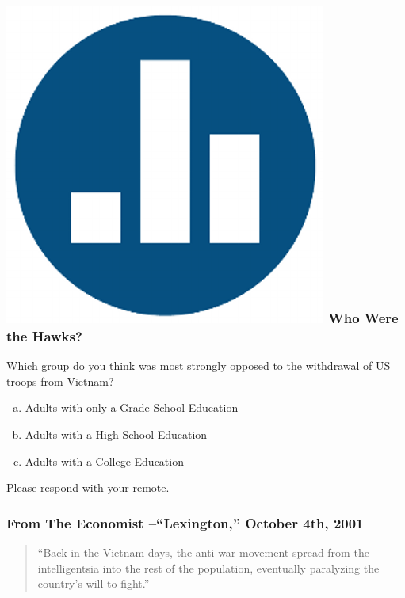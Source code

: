 \begin{frame}
\frametitle{\includegraphics[scale = 0.05]{./images/clicker} \hfill Who Were the Hawks?}
Which group do you think was most strongly \alert{opposed to} the withdrawal of US troops from Vietnam?
\begin{enumerate}[(a)]
	\item Adults with only a Grade School Education
	\item Adults with a High School Education
	\item Adults with a College Education
\end{enumerate}
\vspace{2em}
Please respond with your remote.

\end{frame}
\begin{frame}
\frametitle{From The Economist --``Lexington,'' October 4th, 2001}
\begin{quote}
 ``Back in the Vietnam days, the anti-war movement spread from the intelligentsia into the rest of the population, eventually paralyzing the country's will to fight.''
\end{quote}

\end{frame}


